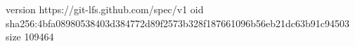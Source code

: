 version https://git-lfs.github.com/spec/v1
oid sha256:4bfa08980538403d384772d89f2573b328f187661096b56eb21dc63b91c94503
size 109464
